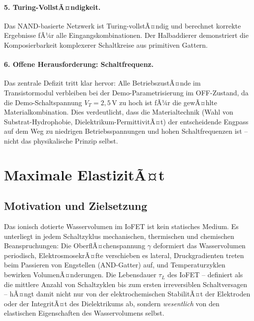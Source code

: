 ﻿\documentclass[a4paper,12pt]{scrreprt}
\theoremstyle{definition}
\begin{document}
\paragraph{5. Turing-VollstÃ¤ndigkeit.}
Das NAND-basierte Netzwerk ist Turing-vollstÃ¤ndig und berechnet korrekte
Ergebnisse fÃ¼r alle Eingangskombinationen. Der Halbaddierer demonstriert
die Komposierbarkeit komplexerer Schaltkreise aus primitiven Gattern.

\paragraph{6. Offene Herausforderung: Schaltfrequenz.}
Das zentrale Defizit tritt klar hervor: Alle BetriebszustÃ¤nde im
Transistormodul verbleiben bei der Demo-Parametrisierung im OFF-Zustand,
da die Demo-Schaltspannung $V_T = 2{,}5$\,V zu hoch ist fÃ¼r die
gewÃ¤hlte Materialkombination. Dies verdeutlicht, dass die Materialtechnik
(Wahl von Substrat-Hydrophobie, Dielektrikum-PermittivitÃ¤t) der
entscheidende Engpass auf dem Weg zu niedrigen Betriebsspannungen und
hohen Schaltfrequenzen ist -- nicht das physikalische Prinzip selbst.


\section{Maximale ElastizitÃ¤t}
\label{sec:elastizitaet_lebensdauer}

\subsection{Motivation und Zielsetzung}

Das ionisch dotierte Wasservolumen im IoFET ist kein statisches Medium.
Es unterliegt in jedem Schaltzyklus mechanischen, thermischen und
chemischen Beanspruchungen: Die OberflÃ¤chenspannung $\gamma$ deformiert
das Wasservolumen periodisch, ElektrosmosekrÃ¤fte verschieben es lateral,
Druckgradienten treten beim Passieren von Engstellen (AND-Gatter) auf,
und Temperaturzyklen bewirken VolumenÃ¤nderungen. Die Lebensdauer $\tau_L$
des IoFET -- definiert als die mittlere Anzahl von Schaltzyklen bis zum
ersten irreversiblen Schaltversagen -- hÃ¤ngt damit nicht nur von der
elektrochemischen StabilitÃ¤t der Elektroden oder der IntegritÃ¤t des
Dielektrikums ab, sondern \emph{wesentlich} von den elastischen
Eigenschaften des Wasservolumens selbst.
\end{document}
